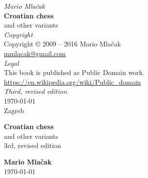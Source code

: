 \documentclass[a5paper,12pt,draft]{book} %
\begin{document}
\thispagestyle{empty}
\vspace*{0.1\textheight}
\begin{center}
    \emph{Mario Mlačak} \\
    \textbf{Croatian chess} \\
    and other variants \\ [2.0em]

    \emph{Copyright} \\
    Copyright \copyright \hspace{0.2ex} 2009 -- 2016 Mario Mlačak \\
    \href{mailto:mmlacak@gmail.com}{mmlacak@gmail.com} \\ [2.0em]

    \emph{Legal} \\
    This book is published as Public Domain work. \\
    \href{https://en.wikipedia.org/wiki/Public\_domain}{https://en.wikipedia.org/wiki/Public\_domain} \\ [2.0em]

    \emph{Third, revised edition} \\
    \today \\
    Zagreb

    \vfill

    \LaTeXe
    \vspace{0.1\textheight}
\end{center}
\clearpage

\thispagestyle{empty}
\vspace*{0.2\textheight}
\begin{center}
    \textbf{\Large{Croatian chess}} \\ [1.0em]
    \large{and other variants} \\ [1.0em]
    \small{3rd, revised edition} \\ [2.0cm]
    \vspace*{0.2\textheight}

    \textbf{\large{Mario Mlačak}} \\ [1.0em]
    \small{\today} %
\end{center}
\clearpage

\thispagestyle{empty}
\vspace*{0.1\textheight}
\clearpage
\end{document}
